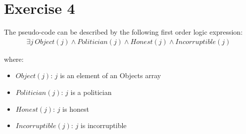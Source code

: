 \section*{Exercise 4}

The pseudo-code can be described by the following first order logic expression:
\smallskip
\begin{gather*}
\exists j \ Object(j) \land Politician(j) \land Honest(j) \land Incorruptible(j)
\end{gather*}

where:

\begin{itemize}

\item $Object(j)$: $j$ is an element of an Objects array

\item $Politician(j)$: $j$ is a politician

\item $Honest(j)$: $j$ is honest

\item $Incorruptible(j)$: $j$ is incorruptible

\end{itemize} 

